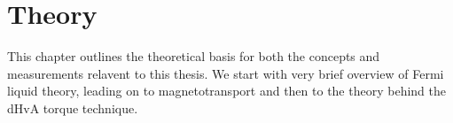 \chapter{Theory}

This chapter outlines the theoretical basis for both the concepts and measurements relavent to this thesis. We start with very brief overview of Fermi liquid theory, leading on to magnetotransport and then to the theory behind the \ac{dHvA} torque technique.













